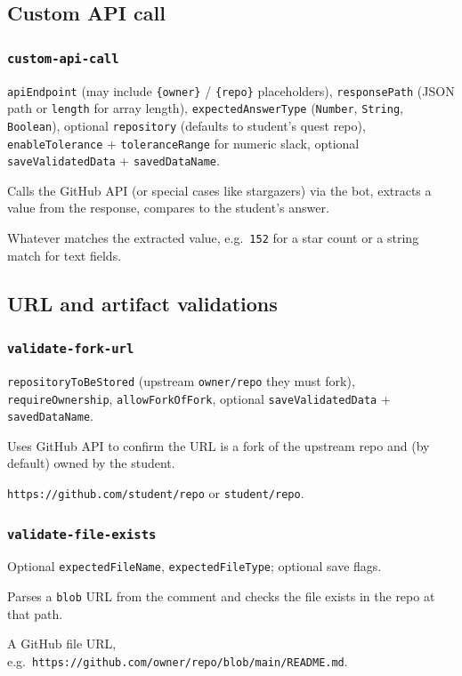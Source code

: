 \documentclass[11pt,a4paper]{article}
\newcommand{\field}[1]{\texttt{#1}}
\newcommand{\subtype}[1]{\subsubsection*{#1}}
\begin{document}
\subsection{Custom API call}

\subtype{\texttt{custom-api-call}}
\begin{description}[style=nextline,leftmargin=0cm]
  \item[Fields] \field{apiEndpoint} (may include \texttt{\{owner\}} / \texttt{\{repo\}} placeholders), \field{responsePath} (JSON path or \texttt{length} for array length), \field{expectedAnswerType} (\texttt{Number}, \texttt{String}, \texttt{Boolean}), optional \field{repository} (defaults to student's quest repo), \field{enableTolerance} + \field{toleranceRange} for numeric slack, optional \field{saveValidatedData} + \field{savedDataName}.
  \item[Why / use] Calls the GitHub API (or special cases like stargazers) via the bot, extracts a value from the response, compares to the student's answer.
  \item[Student should post] Whatever matches the extracted value, e.g.\ \texttt{152} for a star count or a string match for text fields.
\end{description}

\subsection{URL and artifact validations}

\subtype{\texttt{validate-fork-url}}
\begin{description}[style=nextline,leftmargin=0cm]
  \item[Fields] \field{repositoryToBeStored} (upstream \texttt{owner/repo} they must fork), \field{requireOwnership}, \field{allowForkOfFork}, optional \field{saveValidatedData} + \field{savedDataName}.
  \item[Why / use] Uses GitHub API to confirm the URL is a fork of the upstream repo and (by default) owned by the student.
  \item[Student should post] \texttt{https://github.com/student/repo} or \texttt{student/repo}.
\end{description}

\subtype{\texttt{validate-file-exists}}
\begin{description}[style=nextline,leftmargin=0cm]
  \item[Fields] Optional \field{expectedFileName}, \field{expectedFileType}; optional save flags.
  \item[Why / use] Parses a \texttt{blob} URL from the comment and checks the file exists in the repo at that path.
  \item[Student should post] A GitHub file URL, e.g.\ \texttt{https://github.com/owner/repo/blob/main/README.md}.
\end{description}
\end{document}

